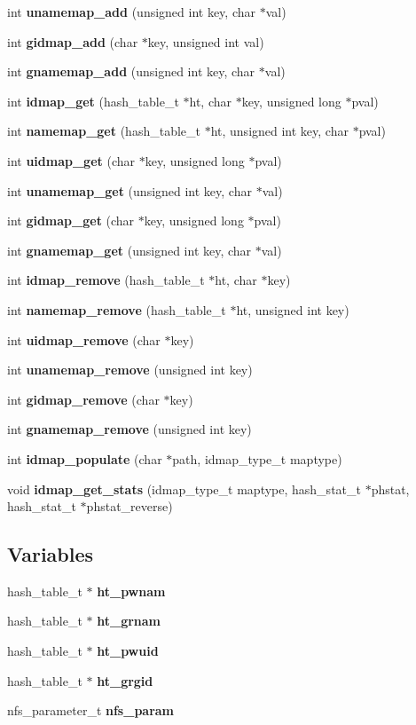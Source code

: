 \begin{CompactItemize}
\item 
int {\bf unamemap\_\-add} (unsigned int key, char $\ast$val)
\item 
int {\bf gidmap\_\-add} (char $\ast$key, unsigned int val)
\item 
int {\bf gnamemap\_\-add} (unsigned int key, char $\ast$val)
\item 
int {\bf idmap\_\-get} (hash\_\-table\_\-t $\ast$ht, char $\ast$key, unsigned long $\ast$pval)
\item 
int {\bf namemap\_\-get} (hash\_\-table\_\-t $\ast$ht, unsigned int key, char $\ast$pval)
\item 
int {\bf uidmap\_\-get} (char $\ast$key, unsigned long $\ast$pval)
\item 
int {\bf unamemap\_\-get} (unsigned int key, char $\ast$val)
\item 
int {\bf gidmap\_\-get} (char $\ast$key, unsigned long $\ast$pval)
\item 
int {\bf gnamemap\_\-get} (unsigned int key, char $\ast$val)
\item 
int {\bf idmap\_\-remove} (hash\_\-table\_\-t $\ast$ht, char $\ast$key)
\item 
int {\bf namemap\_\-remove} (hash\_\-table\_\-t $\ast$ht, unsigned int key)
\item 
int {\bf uidmap\_\-remove} (char $\ast$key)
\item 
int {\bf unamemap\_\-remove} (unsigned int key)
\item 
int {\bf gidmap\_\-remove} (char $\ast$key)
\item 
int {\bf gnamemap\_\-remove} (unsigned int key)
\item 
int {\bf idmap\_\-populate} (char $\ast$path, idmap\_\-type\_\-t maptype)
\item 
void {\bf idmap\_\-get\_\-stats} (idmap\_\-type\_\-t maptype, hash\_\-stat\_\-t $\ast$phstat, hash\_\-stat\_\-t $\ast$phstat\_\-reverse)
\end{CompactItemize}
\subsection*{Variables}
\begin{CompactItemize}
\item 
hash\_\-table\_\-t $\ast$ {\bf ht\_\-pwnam}
\item 
hash\_\-table\_\-t $\ast$ {\bf ht\_\-grnam}
\item 
hash\_\-table\_\-t $\ast$ {\bf ht\_\-pwuid}
\item 
hash\_\-table\_\-t $\ast$ {\bf ht\_\-grgid}
\item 
nfs\_\-parameter\_\-t {\bf nfs\_\-param}
\end{CompactItemize}


